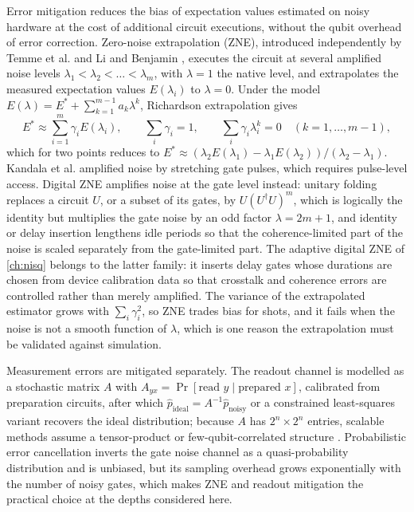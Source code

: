 Error mitigation reduces the bias of expectation values estimated on noisy hardware at the cost of additional circuit executions, without the qubit overhead of error correction. Zero-noise extrapolation (ZNE), introduced independently by Temme et al. \cite{temme2017errormitigation} and Li and Benjamin \cite{li2017activeerror}, executes the circuit at several amplified noise levels $\lambda_1<\lambda_2<\dots<\lambda_m$, with $\lambda=1$ the native level, and extrapolates the measured expectation values $E(\lambda_i)$ to $\lambda=0$. Under the model $E(\lambda)=E^{\ast}+\sum_{k=1}^{m-1}a_k\lambda^k$, Richardson extrapolation gives
\begin{equation}\label{eq:bg:zne}
E^{\ast}\approx\sum_{i=1}^{m}\gamma_iE(\lambda_i),\qquad \sum_{i}\gamma_i=1,\qquad \sum_{i}\gamma_i\lambda_i^{k}=0\quad(k=1,\dots,m-1),
\end{equation}
which for two points reduces to $E^{\ast}\approx(\lambda_2E(\lambda_1)-\lambda_1E(\lambda_2))/(\lambda_2-\lambda_1)$. Kandala et al. \cite{kandala2019errormitigation} amplified noise by stretching gate pulses, which requires pulse-level access. Digital ZNE \cite{giurgicatiron2020digitalzne} amplifies noise at the gate level instead: unitary folding replaces a circuit $U$, or a subset of its gates, by $U(U^{\dagger}U)^{m}$, which is logically the identity but multiplies the gate noise by an odd factor $\lambda=2m+1$, and identity or delay insertion lengthens idle periods so that the coherence-limited part of the noise is scaled separately from the gate-limited part. The adaptive digital ZNE of \cref{ch:nisq} \cite{guo2025deal} belongs to the latter family: it inserts delay gates whose durations are chosen from device calibration data so that crosstalk and coherence errors are controlled rather than merely amplified. The variance of the extrapolated estimator grows with $\sum_i\gamma_i^2$, so ZNE trades bias for shots, and it fails when the noise is not a smooth function of $\lambda$, which is one reason the extrapolation must be validated against simulation.

Measurement errors are mitigated separately. The readout channel is modelled as a stochastic matrix $A$ with $A_{yx}=\Pr[\text{read }y\mid\text{prepared }x]$, calibrated from preparation circuits, after which $\hat{p}_{\mathrm{ideal}}=A^{-1}\hat{p}_{\mathrm{noisy}}$ or a constrained least-squares variant recovers the ideal distribution; because $A$ has $2^n\times2^n$ entries, scalable methods assume a tensor-product or few-qubit-correlated structure \cite{bravyi2021measurement}. Probabilistic error cancellation \cite{temme2017errormitigation} inverts the gate noise channel as a quasi-probability distribution and is unbiased, but its sampling overhead grows exponentially with the number of noisy gates, which makes ZNE and readout mitigation the practical choice at the depths considered here.

